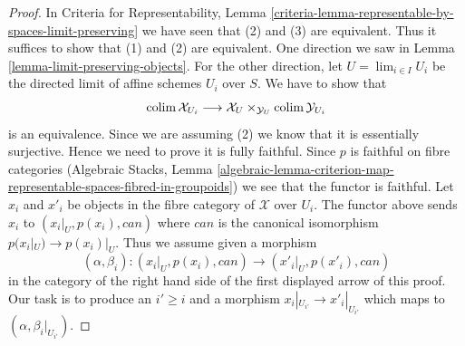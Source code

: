 \begin{proof}
In Criteria for Representability, Lemma
\ref{criteria-lemma-representable-by-spaces-limit-preserving}
we have seen that (2) and (3) are equivalent.
Thus it suffices to show that (1) and (2) are equivalent.
One direction we saw in Lemma \ref{lemma-limit-preserving-objects}.
For the other direction, let $U = \lim_{i \in I} U_i$ be the directed limit
of affine schemes $U_i$ over $S$. We have to show that
$$
\mathop{\mathrm{colim}}\nolimits \mathcal{X}_{U_i} \longrightarrow
\mathcal{X}_U \times_{\mathcal{Y}_U} \mathop{\mathrm{colim}}\nolimits \mathcal{Y}_{U_i}
$$
is an equivalence. Since we are assuming (2) we know that it is essentially
surjective. Hence we need to prove it is fully faithful.
Since $p$ is faithful on fibre categories
(Algebraic Stacks, Lemma
\ref{algebraic-lemma-criterion-map-representable-spaces-fibred-in-groupoids})
we see that the functor is faithful. Let $x_i$ and $x'_i$ be objects
in the fibre category of $\mathcal{X}$ over $U_i$.
The functor above sends $x_i$ to $(x_i|_U, p(x_i), can)$ where
$can$ is the canonical isomorphism $p(x_i|_U) \to p(x_i)|_U$.
Thus we assume given a morphism
$$
(\alpha, \beta_i) : (x_i|_U, p(x_i), can) \longrightarrow
(x'_i|_U, p(x'_i), can)
$$
in the category of the right hand side of the first displayed arrow
of this proof. Our task is to produce an $i' \geq i$ and a morphism
$x_i|_{U_{i'}} \to x'_i|_{U_{i'}}$ which maps to
$(\alpha, \beta_i|_{U_{i'}})$.


\end{proof}

